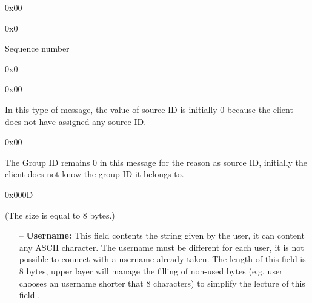\documentclass{article}
\begin{document}
\begin{description}[align=left]
    \item [Type:] 0x00
        
    \item [Reserved:] 0x0
        
    \item [Sequence:] Sequence number
    
    \item [Acknowledgement:] 0x0
    
    \item [Source ID:] 0x00
    \begin{flushleft}
        In this type of message, the value of source ID is initially 0 because the client does not have assigned any source ID.
    \end{flushleft}
    
    \item [Group ID:] 0x00
    \begin{flushleft}
        The Group ID remains 0 in this message for the reason as source ID, initially the client does not know the group ID it belongs to.
    \end{flushleft}
        
    \item [Header Length:] 0x000D

    \item[Options:] (The size is equal to 8 bytes.)
    \begin{itemize}
        \item[--]\textbf{Username:} This field contents the string given by the user, it can content any ASCII character. The username must be different for each user, it is not possible to connect with a username already taken. The length of this field is 8 bytes, upper layer will manage the filling of non-used bytes (e.g. user chooses an username shorter that 8 characters) to simplify the lecture of this field .
    \end{itemize}
\end{description}
\end{document}
